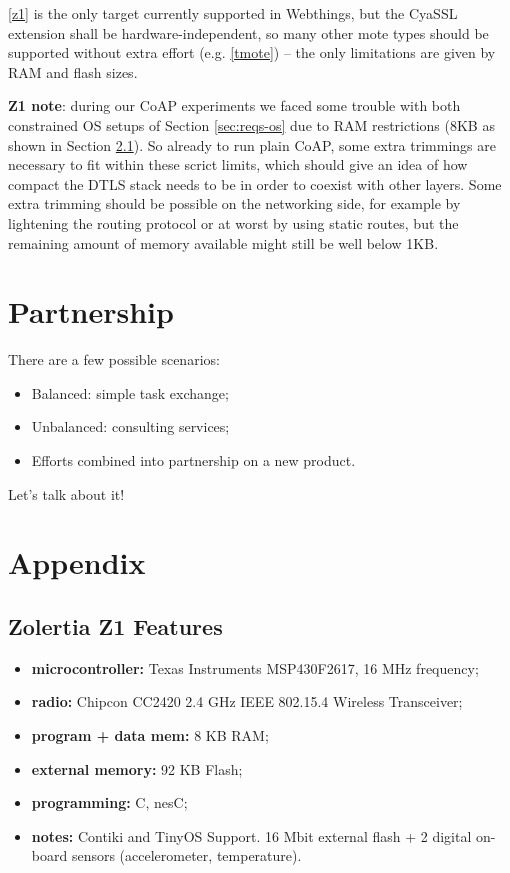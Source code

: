 \documentclass[10pt]{article}
\begin{document}
\ref{z1} is the only target currently supported in Webthings, but the CyaSSL extension shall be hardware-independent, so many other mote types should be supported without extra effort (e.g. \ref{tmote}) -- the only limitations are given by RAM and flash sizes.

\textbf{Z1 note}: during our CoAP experiments we faced some trouble with both constrained OS setups of Section \ref{sec:reqs-os} due to RAM restrictions (8KB as shown in Section \ref{sec:z1-feats}). So already to run plain CoAP, some extra trimmings are necessary to fit within these scrict limits, which should give an idea of how compact the DTLS stack needs to be in order to coexist with other layers. Some extra trimming should be possible on the networking side, for example by lightening the routing protocol or at worst by using static routes, but the remaining amount of memory available might still be well below 1KB.

\section{Partnership}
There are a few possible scenarios:
\begin{itemize}
  \item Balanced: simple task exchange;
  \item Unbalanced: consulting services;
  \item Efforts combined into partnership on a new product.
\end{itemize}
Let's talk about it!

\section{Appendix}

\subsection{Zolertia Z1 Features}
\label{sec:z1-feats}
\begin{itemize}
  \item \textbf{microcontroller:} Texas Instruments MSP430F2617, 16 MHz frequency;
  \item \textbf{radio:} Chipcon CC2420 2.4 GHz IEEE 802.15.4 Wireless Transceiver;
  \item \textbf{program + data mem:} 8 KB RAM;
  \item \textbf{external memory:} 92 KB Flash;
  \item \textbf{programming:} C, nesC;
  \item \textbf{notes:} Contiki and TinyOS Support. 16 Mbit external flash + 2 digital on-board sensors (accelerometer, temperature).
\end{itemize}
\end{document}
